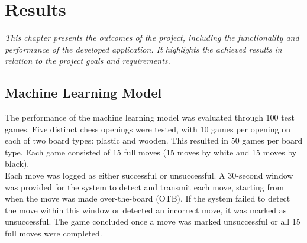 \chapter{Results}


\begin{center}
    \textit{This chapter presents the outcomes of the project, including the functionality and performance of the developed application. It highlights the achieved results in relation to the project goals and requirements.}
\end{center}

\section{Machine Learning Model}

The performance of the machine learning model was evaluated through 100 test games. Five distinct chess openings were tested, with 10 games per opening on each of two board types: plastic and wooden. This resulted in 50 games per board type. Each game consisted of 15 full moves (15 moves by white and 15 moves by black). \\

Each move was logged as either successful or unsuccessful. A 30-second window was provided for the system to detect and transmit each move, starting from when the move was made over-the-board (OTB). If the system failed to detect the move within this window or detected an incorrect move, it was marked as unsuccessful. The game concluded once a move was marked unsuccessful or all 15 full moves were completed.

\newpage

